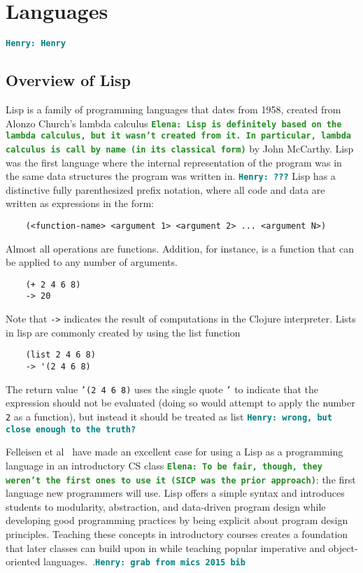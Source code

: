 \documentclass[12pt]{article}
\newcommand{\comment}[1]{{\bf \tt  {#1}}}
\newcommand{\emcomment}[1]{\textcolor{ForestGreen}{\comment{Elena: {#1}}}}
\newcommand{\hfcomment}[1]{\textcolor{Teal}{\comment{Henry: {#1}}}}
\begin{document}
\section{Languages}\label{sec:lang}
	\hfcomment{Henry}

	\subsection{Overview of Lisp}\label{sec:lisp}

	Lisp is a family of programming languages that dates from 1958, created from Alonzo Church's lambda calculus \emcomment{Lisp is definitely based on the lambda calculus, but it wasn't created from it. In particular, lambda calculus is call by name (in its classical form)} by John McCarthy. Lisp was the first language where the internal representation of the program was in the same data structures the program was written in. \hfcomment{???} Lisp has a distinctive fully parenthesized prefix notation, where all code and data are written as expressions in the form:
	\begin{verbatim}
	(<function-name> <argument 1> <argument 2> ... <argument N>)
	\end{verbatim}
Almost all operations are functions. Addition, for instance, is a function that can be applied to any number of arguments.
	\begin{verbatim}
	(+ 2 4 6 8)
	-> 20
	\end{verbatim}
Note that \texttt{->} indicates the result of computations in the Clojure interpreter. Lists in lisp are commonly created by using the list function
 	\begin{verbatim}
	(list 2 4 6 8)
	-> '(2 4 6 8)
	\end{verbatim}
The return value \texttt{'(2 4 6 8)} uses the single quote \texttt{'} to indicate that the expression should not be evaluated (doing so would attempt to apply the number \texttt{2} as a function), but instead it should be treated as list \hfcomment{wrong, but close enough to the truth?}	
	
	Felleisen et al~\cite{Felleisen:2004} have made an excellent case for using a Lisp as a programming language in an introductory CS class \emcomment{To be fair, though, they weren't the first ones to use it (SICP was the prior approach)}:
the first language new programmers will use. Lisp offers a simple
syntax and introduces students to modularity, abstraction, and
data-driven program design while developing good programming
practices by being explicit about program design principles.
Teaching these concepts in introductory courses creates a foundation that later classes can build upon in  while teaching popular imperative and object-oriented languages.~\cite{Bieniusa:2008}.\hfcomment{grab from mics 2015 bib} 
\end{document}
